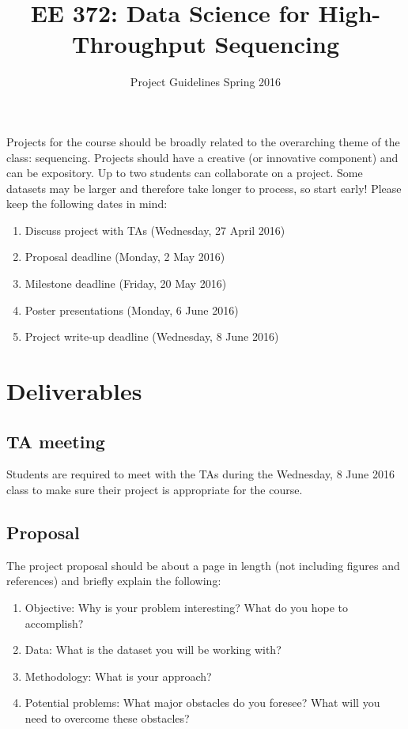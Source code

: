 \documentclass[11pt,onecolumn]{article}
\title{EE 372: Data Science for High-Throughput Sequencing}
\author{Project Guidelines Spring 2016}
\date{\vspace{-5ex}}
\begin{document}
\maketitle

Projects for the course should be broadly related to the overarching theme of the class: sequencing. Projects should have a creative (or innovative component) and can be expository. Up to two students can collaborate on a project. Some datasets may be larger and therefore take longer to process, so start early! Please keep the following dates in mind:

\begin{enumerate}
	\item Discuss project with TAs (Wednesday, 27 April 2016)
	\item Proposal deadline (Monday, 2 May 2016)
	\item Milestone deadline (Friday, 20 May 2016)
	\item Poster presentations (Monday, 6 June 2016)
	\item Project write-up deadline (Wednesday, 8 June 2016)
\end{enumerate}

\section{Deliverables}
\subsection{TA meeting}
Students are required to meet with the TAs during the Wednesday, 8 June 2016 class to make sure their project is appropriate for the course.

\subsection{Proposal}
The project proposal should be about a page in length (not including figures and references) and briefly explain the following:
\begin{enumerate}
	\item Objective: Why is your problem interesting? What do you hope to accomplish?
	\item Data: What is the dataset you will be working with? 
	\item Methodology: What is your approach?
	\item Potential problems: What major obstacles do you foresee? What will you need to overcome these obstacles?
\end{enumerate}
\end{document}
